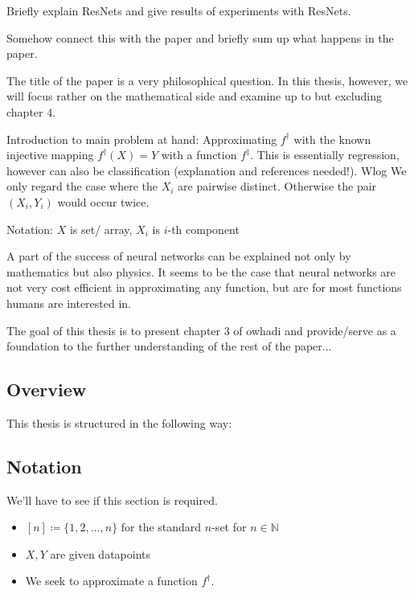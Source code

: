 Briefly explain ResNets and give results of experiments with ResNets.

Somehow connect this with the paper and briefly sum up what happens in the paper.

The title of the paper is a very philosophical question.
In this thesis, however, we will focus rather on the mathematical side and examine \cite{owhadi20} up to but excluding chapter 4.

Introduction to main problem at hand:
Approximating $f^\dagger$ with the known injective mapping $f^\dagger(X) = Y$ with a function $f^\ddagger$.
This is essentially regression, however can also be classification (explanation and references needed!).
Wlog We only regard the case where the $X_i$ are pairwise distinct.
Otherwise the pair $(X_i, Y_i)$ would occur twice.

Notation: $X$ is set/ array, $X_i$ is $i$-th component

A part of the success of neural networks can be explained not only by mathematics but also physics.
It seems to be the case that neural networks are not very cost efficient in approximating any function, but are for most functions humans are interested in.

The goal of this thesis is to present chapter 3 of owhadi and provide/serve as a foundation to the further understanding of the rest of the paper...

\subsection{Overview}
This thesis is structured in the following way:

\subsection{Notation}
We'll have to see if this section is required.
\begin{itemize}
	\item $[n] \coloneqq \{1, 2, \ldots, n\}$ for the standard $n$-set for $n \in \mathbb{N}$
	\item $X, Y$ are given datapoints
	\item We seek to approximate a function $f^\dagger$.
\end{itemize}